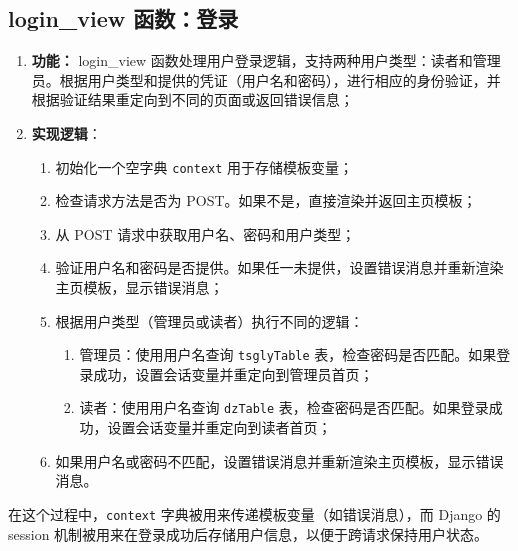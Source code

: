 \documentclass{ctexart}
\begin{document}
    \subsection{login\_view 函数：登录}
    \begin{enumerate}
        \item \textbf{功能：} login\_view 函数处理用户登录逻辑，支持两种用户类型：读者和管理员。根据用户类型和提供的凭证（用户名和密码），进行相应的身份验证，并根据验证结果重定向到不同的页面或返回错误信息；
        \item \textbf{实现逻辑}：
        \begin{enumerate}
            \item 初始化一个空字典 \texttt{context} 用于存储模板变量；
            \item 检查请求方法是否为 POST。如果不是，直接渲染并返回主页模板；
            \item 从 POST 请求中获取用户名、密码和用户类型；
            \item 验证用户名和密码是否提供。如果任一未提供，设置错误消息并重新渲染主页模板，显示错误消息；
            \item 根据用户类型（管理员或读者）执行不同的逻辑：
            \begin{enumerate}
                \item 管理员：使用用户名查询 \texttt{tsglyTable} 表，检查密码是否匹配。如果登录成功，设置会话变量并重定向到管理员首页；
                \item 读者：使用用户名查询 \texttt{dzTable} 表，检查密码是否匹配。如果登录成功，设置会话变量并重定向到读者首页；
            \end{enumerate}
            \item 如果用户名或密码不匹配，设置错误消息并重新渲染主页模板，显示错误消息。
        \end{enumerate}
    \end{enumerate}
    在这个过程中，\texttt{context} 字典被用来传递模板变量（如错误消息），而 Django 的 session 机制被用来在登录成功后存储用户信息，以便于跨请求保持用户状态。
\end{document}
